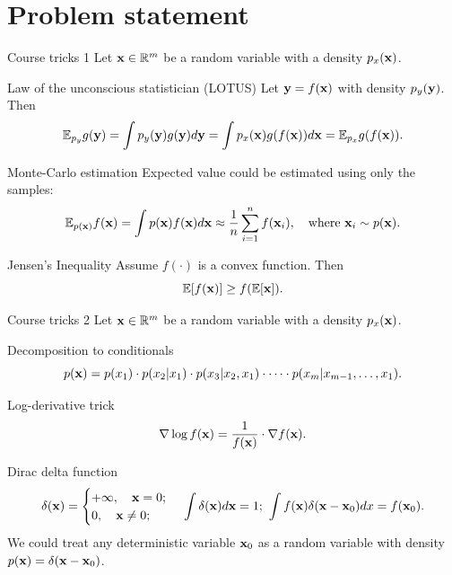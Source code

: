 \section{Problem statement}
\begin{frame}{Course tricks 1}
	Let $\mathbf{x} \in \mathbb{R}^m$ be a random variable with a density $p_x(\mathbf{x})$.
	\begin{block}{Law of the unconscious statistician (LOTUS)}
		Let $\mathbf{y}=f(\mathbf{x})$ with density $p_y(\mathbf{y})$. Then
		\[
			\mathbb{E}_{p_y} g(\mathbf{y}) = \int p_y(\mathbf{y}) g(\mathbf{y}) d \mathbf{y} = \int p_x(\mathbf{x}) g(f(\mathbf{x})) d \mathbf{x} = \mathbb{E}_{p_x} g(f(\mathbf{x})).
		\]
		\vspace{-0.4cm}
	\end{block}
	\begin{block}{Monte-Carlo estimation}
		Expected value could be estimated using only the samples:
		\[
			\mathbb{E}_{p(\mathbf{x})} f(\mathbf{x}) = \int p(\mathbf{x}) f(\mathbf{x}) d \mathbf{x} \approx \frac{1}{n} \sum_{i=1}^n f(\mathbf{x}_i), \quad 
			\text{where } \mathbf{x}_i \sim p(\mathbf{x}).
		\]
	\end{block}
	\begin{block}{Jensen's Inequality}
		Assume $f(\cdot)$ is a convex function. Then
		\[
			\mathbb{E} [f(\mathbf{x})] \geq f(\mathbb{E}[\mathbf{x}]).
		\]
		\vspace{-0.4cm}
	\end{block}
\end{frame}
\begin{frame}{Course tricks 2}
	Let $\mathbf{x} \in \mathbb{R}^m$ be a random variable with a density $p_x(\mathbf{x})$.
	\begin{block}{Decomposition to conditionals}
	\vspace{-0.5cm}
	\[
		p(\mathbf{x}) = p(x_1) \cdot p(x_2 | x_1) \cdot p(x_3 | x_2, x_1) \cdot \dots \cdot p(x_m|x_{m-1},\dots,x_1).
	\]
	\vspace{-0.3cm}
	\end{block}
	\begin{block}{Log-derivative trick}
		\[
			\nabla \log f(\mathbf{x}) = \frac{1}{f(\mathbf{x})} \cdot \nabla f(\mathbf{x}).
		\]
		\vspace{-0.2cm}
	\end{block}
		
	\begin{block}{Dirac delta function}
		\vspace{-0.5cm}
		\[
			\delta(\mathbf{x}) = 
			\begin{cases}
				+\infty, \quad \mathbf{x} = 0; \\
				0, \quad \mathbf{x} \neq 0;
			\end{cases} \, 
			\int \delta(\mathbf{x}) d\mathbf{x} = 1; \,\, 
			\int f(\mathbf{x}) \delta (\mathbf{x} - \mathbf{x}_0) dx = f(\mathbf{x}_0).
		\]
		We could treat any deterministic variable $\mathbf{x}_0$ as a random variable with density $p(\mathbf{x}) = \delta(\mathbf{x} - \mathbf{x}_0)$.
	\end{block}
\end{frame}
